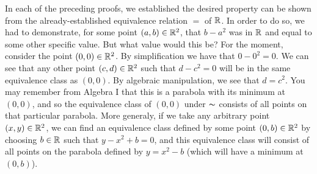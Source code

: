 \documentclass[../main.tex]{subfiles}
\begin{document}
In each of the preceding proofs, we established the desired property can be
shown from the already-established equivalence relation \(=\) of \(\mathbb{R}\). In
order to do so, we had to demonstrate, for some point \((a,b) \in {\mathbb{R}}^2\),
that \(b - {{a}^2}\) was in \(\mathbb{R}\) and equal to some other specific value.
But what value would this be? For the moment, consider the point
\((0,0) \in {\mathbb{R}}^2\). By simplification we have that \(0 - {{0}^2} = 0\). We
can see that any other point \((c,d) \in {\mathbb{R}}^2\) such that
\(d - {{c}^2} = 0\) will be in the same equivalence class as \((0,0)\). By
algebraic manipulation, we see that \(d = {c}^2\). You may remember from Algebra
I that this is a parabola with its minimum at \((0,0)\), and so the equivalence
class of \((0,0)\) under \(\thicksim\) consists of all points on that particular
parabola. More generaly, if we take any arbitrary point
\((x,y) \in {\mathbb{R}}^2\), we can find an equivalence class defined by some point
\((0,b) \in {\mathbb{R}}^2\) by choosing \(b \in \mathbb{R}\) such that
\(y - {{x}^2} + b = 0\), and this equivalence class will consist of all points
on the parabola defined by \(y = {{x}^2} - b\) (which will have a minimum at
\((0,b)\)).
\end{document}
